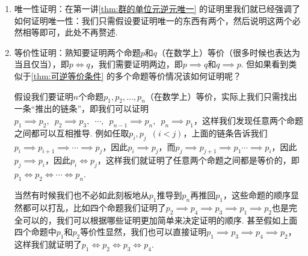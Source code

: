 \begin{enumerate}
\begin{theorem}{}{}
\begin{enumerate}
                  \item $\overline{a}=\overline{b}$.
              \end{enumerate}
          \end{theorem}
          \begin{proof}
              假设$\overline{a}\cap\overline{b}\neq\varnothing$，则存在$x\in\overline{a}\cap\overline{b}$，即$x\,R\,a$且$x\,R\,b$，因此由对称性有$a\,R\,x$，因此由传递性有$aRb$，因此根据等价类的定义可知，二者等价类必然相等，即$\overline{a}=\overline{b}$.
          \end{proof}

          事实上，上面用到的证明思想也涉及了排中律（即$p\lor\lnot p$为真）. 因为证明若$p$成立，则$q$和$r$都成立. 那么我们的思想是，要么$q$成立，得证，要么$\lnot q$成立，然后得出$\lnot q\to r$成立，根据蕴含的真值表知此时$r$必然成立，得证. 显然这一过程需要基于要么$q$成立，要么$\lnot q$成立这一排中律.

    \item 唯一性证明：在第一讲\autoref{thm:群的单位元逆元唯一} 的证明里我们就已经强调了如何证明唯一性：我们只需假设要证明唯一的东西有两个，然后说明这两个必然相等即可，此处不再赘述.

    \item 等价性证明：熟知要证明两个命题$p$和$q$（在数学上）等价（很多时候也表达为当且仅当），即$p\iff q$，我们需要证明两边，即$p\implies q$和$q\implies p$. 但如果看到类似于\autoref{thm:可逆等价条件} 的多个命题等价情况该如何证明呢？

          假设我们要证明$n$个命题$p_1,p_2,\ldots,p_n$（在数学上）等价，实际上我们只需找出一条``推出的链条''，即我们可以证明$p_1\implies p_2,\enspace p_2\implies p_3,\enspace \cdots,\enspace p_{n-1}\implies p_n,\enspace p_n\implies p_1$，这样我们发现任意两个命题之间都可以互相推导. 例如任取$p_i, p_j\enspace (i<j)$，上面的链条告诉我们$p_i\implies p_{i+1}\implies\cdots\implies p_j$，因此$p_i\implies p_j$，而$p_j\implies p_{j+1}\implies p_1\cdots\implies p_i$，因此$p_j\implies p_i$，因此$p_i\iff p_j$，这样我们就证明了任意两个命题之间都是等价的，即$p_1\iff p_2\iff\cdots\iff p_n$.

          当然有时候我们也不必如此刻板地从$p_1$推导到$p_n$再推回$p_1$，这些命题的顺序显然都可以打乱，比如四个命题我们证明了$p_2\implies p_4\implies p_3\implies p_1 \implies p_2$也是完全可以的，我们可以根据哪些证明更加简单来决定证明的顺序. 甚至假如上面四个命题中$p_1$和$p_2$等价性显然，我们也可以直接证明$p_1\implies p_3\implies p_4\implies p_2$，这样我们就证明了$p_1\iff p_2\iff p_3\iff p_4$.


\end{enumerate}

